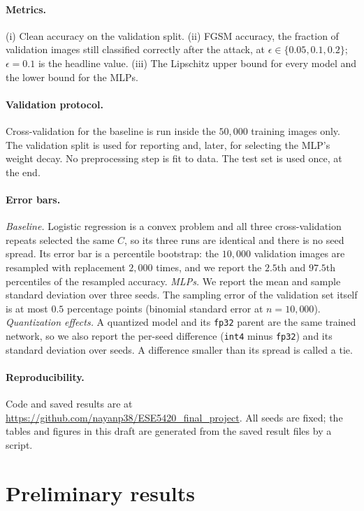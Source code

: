 \documentclass{article}
\newcommand{\fp}{\texttt{fp32}}
\newcommand{\ifour}{\texttt{int4}}
\begin{document}
\paragraph{Metrics.} (i) Clean accuracy on the validation split. (ii) FGSM accuracy, the fraction of validation images still classified correctly after the attack, at $\epsilon \in \{0.05, 0.1, 0.2\}$; $\epsilon = 0.1$ is the headline value. (iii) The Lipschitz upper bound for every model and the lower bound for the MLPs.

\paragraph{Validation protocol.} Cross-validation for the baseline is run inside the $50{,}000$ training images only. The validation split is used for reporting and, later, for selecting the MLP's weight decay. No preprocessing step is fit to data. The test set is used once, at the end.

\paragraph{Error bars.} \emph{Baseline.} Logistic regression is a convex problem and all three cross-validation repeats selected the same $C$, so its three runs are identical and there is no seed spread. Its error bar is a percentile bootstrap: the $10{,}000$ validation images are resampled with replacement $2{,}000$ times, and we report the $2.5$th and $97.5$th percentiles of the resampled accuracy. \emph{MLPs.} We report the mean and sample standard deviation over three seeds. The sampling error of the validation set itself is at most $0.5$ percentage points (binomial standard error at $n = 10{,}000$). \emph{Quantization effects.} A quantized model and its \fp{} parent are the same trained network, so we also report the per-seed difference (\ifour{} minus \fp{}) and its standard deviation over seeds. A difference smaller than its spread is called a tie.

\paragraph{Reproducibility.} Code and saved results are at \url{https://github.com/nayanp38/ESE5420_final_project}. All seeds are fixed; the tables and figures in this draft are generated from the saved result files by a script.

\section{Preliminary results}
\label{sec:results}
\end{document}
